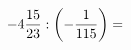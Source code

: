 \documentclass[preview]{standalone}
\begin{document}
\begin{align*}
-4 { 15 \over 23 }  :  \left( - { 1 \over 115 } \right)  =
\end{align*}
\end{document}
